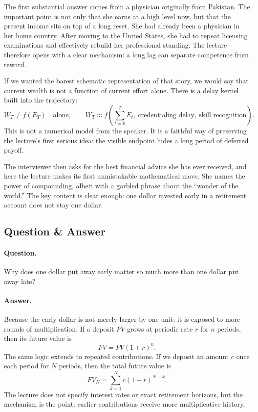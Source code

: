 The first substantial answer comes from a physician originally from Pakistan. The important point is not only that she earns at a high level now, but that the present income sits on top of a long reset. She had already been a physician in her home country. After moving to the United States, she had to repeat licensing examinations and effectively rebuild her professional standing. The lecture therefore opens with a clear mechanism: a long lag can separate competence from reward.

If we wanted the barest schematic representation of that story, we would say that current wealth is not a function of current effort alone. There is a delay kernel built into the trajectory:
\begin{equation}
W_T \neq f(E_T) \quad \text{alone}, \qquad
W_T \approx f\!\left(\sum_{t=0}^{T} E_t,\ \text{credentialing delay},\ \text{skill recognition}\right).
\end{equation}
This is not a numerical model from the speaker. It is a faithful way of preserving the lecture's first serious idea: the visible endpoint hides a long period of deferred payoff.

The interviewer then asks for the best financial advice she has ever received, and here the lecture makes its first unmistakable mathematical move. She names the power of compounding, albeit with a garbled phrase about the ``wonder of the world.'' The key content is clear enough: one dollar invested early in a retirement account does not stay one dollar.

\subsection{Question \& Answer}

\paragraph{Question.} Why does one dollar put away early matter so much more than one dollar put away late?

\paragraph{Answer.} Because the early dollar is not merely larger by one unit; it is exposed to more rounds of multiplication. If a deposit \(PV\) grows at periodic rate \(r\) for \(n\) periods, then its future value is
\begin{equation}
FV = PV(1+r)^n.
\end{equation}
The same logic extends to repeated contributions. If we deposit an amount \(c\) once each period for \(N\) periods, then the total future value is
\begin{equation}
FV_N = \sum_{k=1}^{N} c(1+r)^{N-k}.
\end{equation}
The lecture does not specify interest rates or exact retirement horizons, but the mechanism is the point: earlier contributions receive more multiplicative history.

